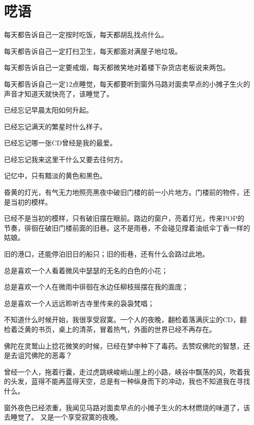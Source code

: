 \chapter[呓语]{呓\qquad 语}


每天都告诉自己一定按时吃饭，每天都胡乱找点什么。

每天都告诉自己一定打扫卫生，每天都面对满屋子地垃圾。

每天都告诉自己一定要戒烟，每天都微笑地对着楼下杂货店老板说来两包。

每天都告诉自己一定12点睡觉，每天都要听到窗外马路对面卖早点的小摊子生火的声音才知道天就快亮了，该睡觉了。

\pskip
已经忘记早晨太阳如何升起。

已经忘记满天的繁星时什么样子。

已经忘记哪一张CD曾经是我的最爱。

已经忘记我来这里干什么又要去往何方。

\pskip
记忆中，只有黯淡的黄色和黑色。

昏黄的灯光，有气无力地照亮黑夜中破旧门楼的前一小片地方。门楼前的物件，还是当初的模样。

已经不是当初的模样，只有破旧摆在眼前。路边的窗户，亮着灯光，传来POP的节奏，徘徊在破旧门楼前面的旧巷。这不是雨巷，不会碰见撑着油纸伞丁香一样的姑娘。

旧的港口，还能停泊旧日的船只；旧的街巷，还有什么会路过此地。

\clearpage
{}

总是喜欢一个人看着微风中瑟瑟的无名的白色的小花；

总是喜欢一个人在微雨中徘徊在水边任柳枝摇摆在我的面庞；

总是喜欢一个人远远聆听古寺里传来的袅袅梵唱；

\pskip
不知道什么时候开始，我很享受寂寞。一个人的夜晚，翻检着落满灰尘的CD，翻检着泛黄的书页，桌上的清茶，冒着热气，外面的世界已经不再存在。

佛陀在灵鹫山上捻花微笑的时候，已经在梦中种下了毒药。去赞叹佛陀的智慧，还是去诅咒佛陀的恶毒？

曾经一个人，拖着行囊，走过虎跳峡峻峭山崖上的小路，峡谷中飘荡的风，吹着我的头发，蓝得不能再蓝得天空，总是有一种纵身而下的冲动，我也不知道我在寻找什么。

\pskip
窗外夜色已经浓重，我闻见马路对面卖早点的小摊子生火的木材燃烧的味道了，该去睡觉了。
又是一个享受寂寞的夜晚。


